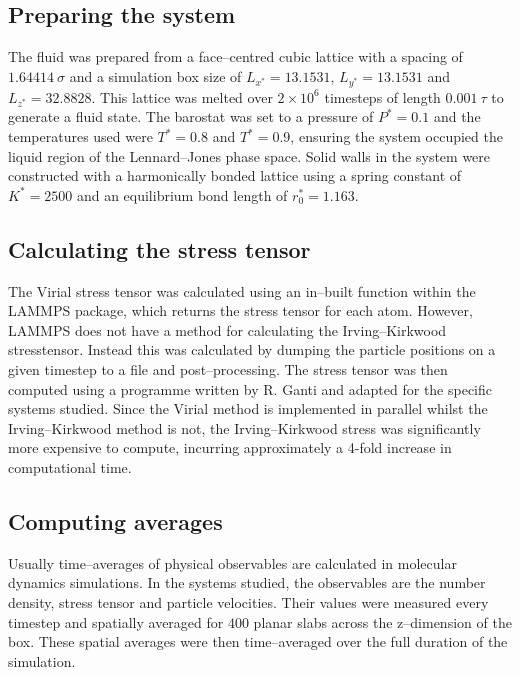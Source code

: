 \subsection{Preparing the system}\label{SystemPrep}
The fluid was prepared from a face--centred cubic lattice with a spacing of $1.64414\ \sigma$ and a simulation box size of $L_{x^{*}}=13.1531$, $L_{y^{*}}=13.1531$ and $L_{z^{*}}=32.8828$.
This lattice was melted over $2\times 10^{6}$ timesteps of length $0.001\ \tau$ to generate a fluid state.
The barostat was set to a pressure of $P^{*} = 0.1$ and the temperatures used were $T^{*} = 0.8$ and $T^{*} = 0.9$, ensuring the system occupied the liquid region of the Lennard--Jones phase space.\cite{Smit}
Solid walls in the system were constructed with a harmonically bonded lattice using a spring constant of $K^{*} = 2500$ and an equilibrium bond length of $r^{*}_{0}=1.163$.

\subsection{Calculating the stress tensor}\label{CalcStress}
The Virial stress tensor was calculated using an in--built function within the LAMMPS package, which returns the stress tensor for each atom.
However, LAMMPS does not have a method for calculating the Irving--Kirkwood stresstensor.
Instead this was calculated by dumping the particle positions on a given timestep to a file and post--processing.
The stress tensor was then computed using a programme written by R. Ganti and adapted for the specific systems studied.
Since the Virial method is implemented in parallel whilst the Irving--Kirkwood method is not, the Irving--Kirkwood stress was significantly more expensive to compute, incurring approximately a 4-fold increase in computational time.

\subsection{Computing averages}\label{ComputeAve}
Usually time--averages of physical observables are calculated in molecular dynamics simulations. 
In the systems studied, the observables are the number density, stress tensor and particle velocities.
Their values were measured every timestep and spatially averaged for $400$ planar slabs across the z--dimension of the box.
These spatial averages were then time--averaged over the full duration of the simulation.

